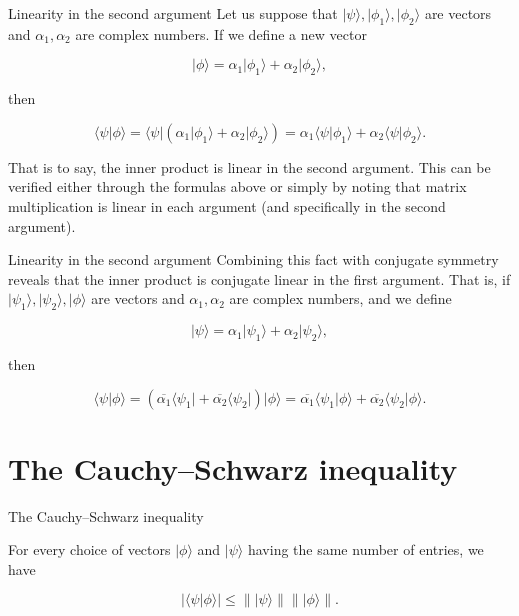 \documentclass[12pt, aspectratio=169]{beamer}
\begin{document}
\begin{frame}{Linearity in the second argument}
Let us suppose that \(\vert \psi \rangle, \vert \phi_1 \rangle, \vert \phi_2 \rangle\) are vectors and \(\alpha_1, \alpha_2\) are complex numbers. If we define a new vector

\[
\vert \phi \rangle = \alpha_1 \vert \phi_1 \rangle + \alpha_2 \vert \phi_2 \rangle,
\]

then

\[
\langle \psi \vert \phi \rangle = \langle \psi \vert (\alpha_1 \vert \phi_1 \rangle + \alpha_2 \vert \phi_2 \rangle) = \alpha_1 \langle \psi \vert \phi_1 \rangle + \alpha_2 \langle \psi \vert \phi_2 \rangle.
\]

That is to say, the inner product is linear in the second argument. This can be verified either through the formulas above or simply by noting that matrix multiplication is linear in each argument (and specifically in the second argument).
\end{frame}
\begin{frame}{Linearity in the second argument}
Combining this fact with conjugate symmetry reveals that the inner product is conjugate linear in the first argument. That is, if \(\vert \psi_1 \rangle, \vert \psi_2 \rangle, \vert \phi \rangle\) are vectors and \(\alpha_1, \alpha_2\) are complex numbers, and we define

\[
\vert \psi \rangle = \alpha_1 \vert \psi_1 \rangle + \alpha_2 \vert \psi_2 \rangle,
\]

then

\[
\langle \psi \vert \phi \rangle = (\overline{\alpha_1} \langle \psi_1 \vert + \overline{\alpha_2} \langle \psi_2 \vert) \vert \phi \rangle = \overline{\alpha_1} \langle \psi_1 \vert \phi \rangle + \overline{\alpha_2} \langle \psi_2 \vert \phi \rangle.
\]

\end{frame}
\section{The Cauchy–Schwarz inequality}
\begin{frame}{The Cauchy–Schwarz inequality}

For every choice of vectors \(\vert \phi \rangle\) and \(\vert \psi \rangle\) having the same number of entries, we have

\[
\bigl\vert \langle \psi \vert \phi \rangle\bigr| \leq \bigl\| \vert\psi \rangle \bigr\| \bigl\| \vert \phi \rangle \bigr\|.
\]
\end{frame}
\end{document}
